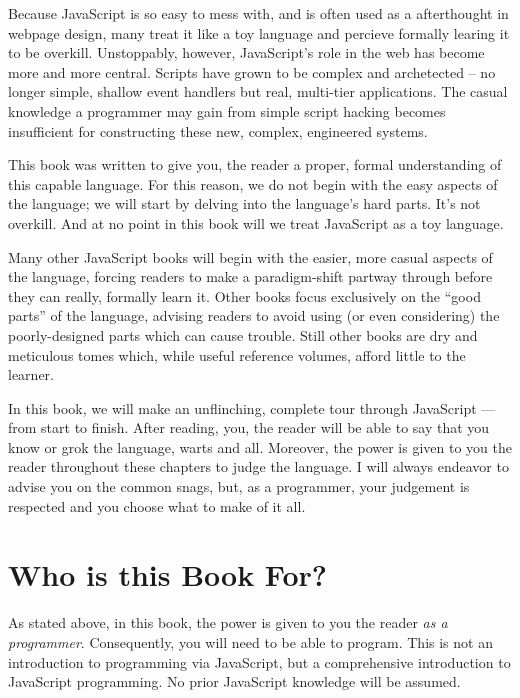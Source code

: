 \documentclass[11pt,letter]{book}
\begin{document}
    Because JavaScript is so easy to mess with, and is often used as a afterthought in webpage 
    design, many treat it like a toy language and percieve formally learing it to be overkill. 
    Unstoppably, however, JavaScript's role in the web has become more and more central. Scripts 
    have grown to be complex and archetected -- no longer simple, shallow event handlers but real, 
    multi-tier applications. The casual knowledge a programmer may gain from simple script hacking
    becomes insufficient for constructing these new, complex, engineered systems.
    
    This book was written to give you, the reader a proper, formal understanding of this capable 
    language. For this reason, we do not begin with the easy aspects of the language; we will start 
    by delving into the language's hard parts. It's not overkill. And at no point in this book will 
    we treat JavaScript as a toy language. 
    
    Many other JavaScript books will begin with the easier, more casual aspects of the language, 
    forcing readers to make a paradigm-shift partway through before they can really, formally learn 
    it. Other books focus exclusively on the ``good parts'' of the language, advising readers to 
    avoid using (or even considering) the poorly-designed parts which can cause trouble. Still other 
    books are dry and meticulous tomes which, while useful reference volumes, afford little to the 
    learner.
    
    In this book, we will make an unflinching, complete tour through JavaScript --- from start to 
    finish. After reading, you, the reader will be able to say that you know or grok the language, 
    warts and all. Moreover, the power is given to you the reader throughout these chapters to judge 
    the language. I will always endeavor to advise you on the common snags, but, as a programmer, 
    your judgement is respected and you choose what to make of it all.
    
    \section*{Who is this Book For?}
    As stated above, in this book, the power is given to you the reader \emph{as a programmer}. 
    Consequently, you will need to be able to program. This is not an introduction to programming 
    via JavaScript, but a comprehensive introduction to JavaScript programming. No prior 
    JavaScript knowledge will be assumed.
    
\end{document}

